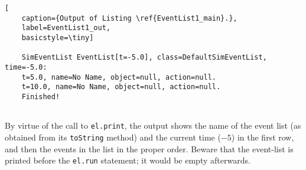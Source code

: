 \begin{lstfloat}
	\begin{lstlisting}[
	caption={Output of Listing \ref{EventList1_main}.},
	label=EventList1_out,
	basicstyle=\tiny]
	
	SimEventList EventList[t=-5.0], class=DefaultSimEventList, time=-5.0:
	t=5.0, name=No Name, object=null, action=null.
	t=10.0, name=No Name, object=null, action=null.
	Finished!
	
	\end{lstlisting}
\end{lstfloat}

By virtue of the call to \lstinline|el.print|,
  the output shows the name of the event list
  (as obtained from its \lstinline{toString} method)
  and the current time ($-5$) in the first row,
  and then the events in the list in the proper order.
Beware that the event-list is printed
  before the \lstinline|el.run| statement;
  it would be empty afterwards.

